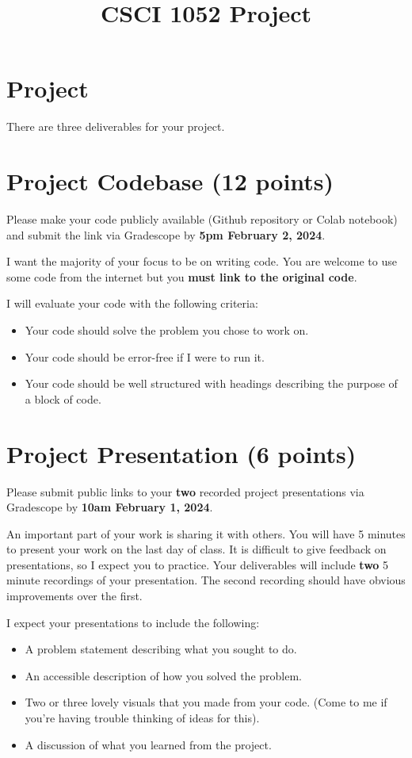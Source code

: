 \documentclass{article}
\title{CSCI 1052 Project}
\date{}
\begin{document}
\maketitle

\section*{Project}

There are three deliverables for your project.

\section{Project Codebase (12 points)}
Please make your code publicly available (Github repository
or Colab notebook) and submit the link via Gradescope by
\textbf{5pm February 2, 2024}.

I want the majority of your focus to be on writing code.
You are welcome to use some code from the internet but you
\textbf{must link to the original code}.

I will evaluate your code with the following criteria:
\begin{itemize}
    \item Your code should solve the problem you chose to work on.
    \item Your code should be error-free if I were to run it.
    \item Your code should be well structured with headings describing 
    the purpose of a block of code.
\end{itemize}

\section{Project Presentation (6 points)}
Please submit public links to your \textbf{two} recorded
project presentations via Gradescope by \textbf{10am February 1, 2024}.

An important part of your work is sharing it with others.
You will have 5 minutes to present your work on the last day of class.
It is difficult to give feedback on presentations, so I expect you to practice.
Your deliverables will include \textbf{two} 5 minute recordings
of your presentation.
The second recording should have obvious improvements over the first.

I expect your presentations to include the following:
\begin{itemize}
    \item A problem statement describing what you sought to do.
    \item An accessible description of how you solved the problem.
    \item Two or three lovely visuals that you made from your code.
    (Come to me if you're having trouble thinking of ideas for this).
    \item A discussion of what you learned from the project.
\end{itemize}
\end{document}
